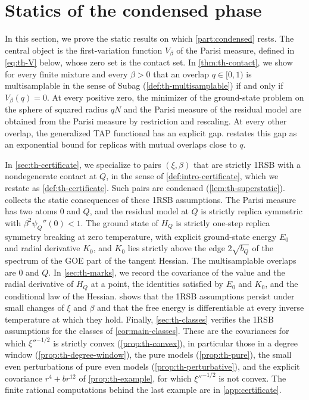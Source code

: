 \chapter{Statics of the condensed phase}\label{sec:thermal}

In this section, we prove the static results on which \cref{part:condensed} rests. The central object is the first-variation function $V_\beta$ of the Parisi measure, defined in \eqref{eq:th-V} below, whose zero set is the contact set. In \cref{thm:th-contact}, we show for every finite mixture and every $\beta>0$ that an overlap $q\in[0,1)$ is multisamplable in the sense of Subag (\cref{def:th-multisamplable}) if and only if $V_\beta(q)=0$. At every positive zero, the minimizer of the ground-state problem on the sphere of squared radius $qN$ and the Parisi measure of the residual model are obtained from the Parisi measure by restriction and rescaling. At every other overlap, the generalized TAP functional has an explicit gap.  restates this gap as an exponential bound for replicas with mutual overlaps close to $q$.

In \cref{sec:th-certificate}, we specialize to pairs $(\xi,\beta)$ that are strictly 1RSB with a nondegenerate contact at $Q$, in the sense of \cref{def:intro-certificate}, which we restate as \cref{def:th-certificate}. Such pairs are condensed (\cref{lem:th-superstatic}).  collects the static consequences of these 1RSB assumptions. The Parisi measure has two atoms $0$ and $Q$, and the residual model at $Q$ is strictly replica symmetric with $\beta^2\psi_Q''(0)<1$. The ground state of $H_Q$ is strictly one-step replica symmetry breaking at zero temperature, with explicit ground-state energy $E_0$ and radial derivative $K_0$, and $K_0$ lies strictly above the edge $2\sqrt{b_Q}$ of the spectrum of the GOE part of the tangent Hessian. The multisamplable overlaps are $0$ and $Q$. In \cref{sec:th-marks}, we record the covariance of the value and the radial derivative of $H_Q$ at a point, the identities satisfied by $E_0$ and $K_0$, and the conditional law of the Hessian.  shows that the 1RSB assumptions persist under small changes of $\xi$ and $\beta$ and that the free energy is differentiable at every inverse temperature at which they hold. Finally, \cref{sec:th-classes} verifies the 1RSB assumptions for the classes of \cref{cor:main-classes}. These are the covariances for which $\xi''^{-1/2}$ is strictly convex (\cref{prop:th-convex}), in particular those in a degree window (\cref{prop:th-degree-window}), the pure models (\cref{prop:th-pure}), the small even perturbations of pure even models (\cref{prop:th-perturbative}), and the explicit covariance $r^4+br^{12}$ of \cref{prop:th-example}, for which $\xi''^{-1/2}$ is not convex. The finite rational computations behind the last example are in \cref{app:certificate}.

